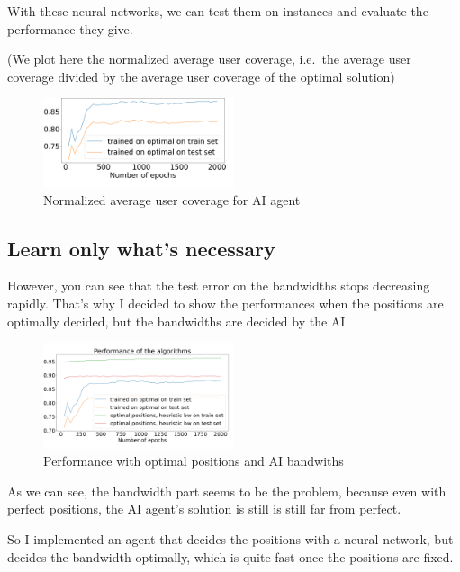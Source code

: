\documentclass[letterpaper]{article}
\begin{document}
\;

With these neural networks, we can test them on instances and evaluate the performance they give.

(We plot here the normalized average user coverage, i.e.\, the average user coverage divided by the average user coverage of the optimal solution)


\begin{figure}[H]
    \centering
    \includegraphics[width=0.5\textwidth]{images/bilan_en _fonction epochs.png}
    \caption{Normalized average user coverage for AI agent}
\end{figure}

\subsection{Learn only what's necessary}

However, you can see that the test error on the bandwidths stops decreasing rapidly.
That's why I decided to show the performances when the positions are optimally decided, but the bandwidths are decided by the AI.

\begin{figure}[H]
    \centering
    \includegraphics[width=0.5\textwidth]{images/bilan_en _fonction epochs_aibw.png}
    \caption{Performance with optimal positions and AI bandwiths}
\end{figure}

As we can see, the bandwidth part seems to be the problem, because even with perfect positions, the AI agent's solution is still
is still far from perfect.

So I implemented an agent that decides the positions with a neural network, but decides the bandwidth optimally,
which is quite fast once the positions are fixed.
\end{document}
